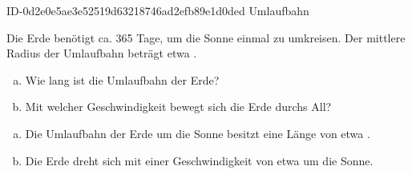 \begin{exercise}
      {ID-0d2e0e5ae3e52519d63218746ad2efb89e1d0ded}
      {Umlaufbahn}
  \ifproblem\problem\par
    Die Erde benötigt ca. \num{365} Tage, um die Sonne einmal zu umkreisen.
    Der mittlere Radius der Umlaufbahn beträgt etwa .
    \begin{enumerate}[a)]
      \item Wie lang ist die Umlaufbahn der Erde?
      \item Mit welcher Geschwindigkeit bewegt sich die Erde durchs All?
    \end{enumerate}
  \fi
  \ifoutcome\outcome\par
    \begin{enumerate}[a)]
      \item Die Umlaufbahn der Erde um die Sonne besitzt eine
            Länge von etwa .
      \item Die Erde dreht sich mit einer Geschwindigkeit von
            etwa  um die Sonne.
    \end{enumerate}
  \fi
\end{exercise}
